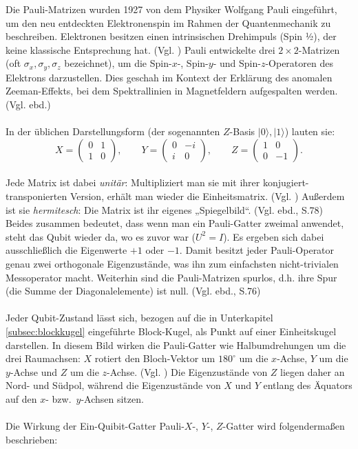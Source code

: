 Die Pauli-Matrizen wurden 1927 von dem Physiker Wolfgang Pauli eingeführt, um den neu entdeckten Elektronenspin im Rahmen der Quantenmechanik zu beschreiben. Elektronen besitzen einen intrinsischen Drehimpuls (Spin ½), der keine klassische Entsprechung hat. (Vgl. \cite[S.312]{wekesa_sirengo_mathematical_2024}) Pauli entwickelte drei $2\times 2$-Matrizen (oft $\sigma_x, \sigma_y, \sigma_z$ bezeichnet), um die Spin-$x$-, Spin-$y$- und Spin-$z$-Operatoren des Elektrons darzustellen. Dies geschah im Kontext der Erklärung des anomalen Zeeman-Effekts, bei dem Spektrallinien in Magnetfeldern aufgespalten werden. (Vgl. ebd.)\\
\\
In der üblichen Darstellungsform (der sogenannten $Z$-Basis ${|0\rangle,|1\rangle}$) lauten sie:
\\
\begin{equation}
\label{equ:pauli_matrizen}
  X=\begin{pmatrix}0&1\\ 1&0\end{pmatrix},\qquad
  Y=\begin{pmatrix}0&-i\\ i&0\end{pmatrix},\qquad
  Z=\begin{pmatrix}1&0\\ 0&-1\end{pmatrix}.
\end{equation}
\\
Jede Matrix ist dabei \emph{unitär}: Multipliziert man sie mit ihrer konjugiert-transponierten Version, erhält man wieder die Einheitsmatrix. (Vgl. \cite[S.71]{nielsen_quantum_2010}) Außerdem ist sie \emph{hermitesch}: Die Matrix ist ihr eigenes „Spiegelbild“. (Vgl. ebd., S.78) Beides zusammen bedeutet, dass wenn man ein Pauli-Gatter zweimal anwendet, steht das Qubit wieder da, wo es zuvor war ($U^2=I$). Es ergeben sich dabei ausschließlich die Eigenwerte $+1$ oder $-1$. Damit besitzt jeder Pauli-Operator genau zwei orthogonale Eigenzustände, was ihn zum einfachsten nicht-trivialen Messoperator macht. Weiterhin sind die Pauli-Matrizen spurlos, d.h. ihre Spur (die Summe der Diagonalelemente) ist null. (Vgl. ebd., S.76)\\
\\
Jeder Qubit-Zustand lässt sich, bezogen auf die in Unterkapitel \ref{subsec:blockkugel} eingeführte Block-Kugel, als Punkt auf einer Einheitskugel darstellen. In diesem Bild wirken die Pauli-Gatter wie Halbumdrehungen um die drei Raumachsen: $X$ rotiert den Bloch-Vektor um $180^{\circ}$ um die $x$-Achse, $Y$ um die $y$-Achse und $Z$ um die $z$-Achse. (Vgl. \cite[S.215ff.]{rieffel_quantum_2011}) Die Eigenzustände von $Z$ liegen daher an Nord- und Südpol, während die Eigenzustände von $X$ und $Y$ entlang des Äquators auf den $x$- bzw.\ $y$-Achsen sitzen.\\
\\
Die Wirkung der Ein-Quibit-Gatter Pauli-$X$-, $Y$-, $Z$-Gatter wird folgendermaßen beschrieben:



